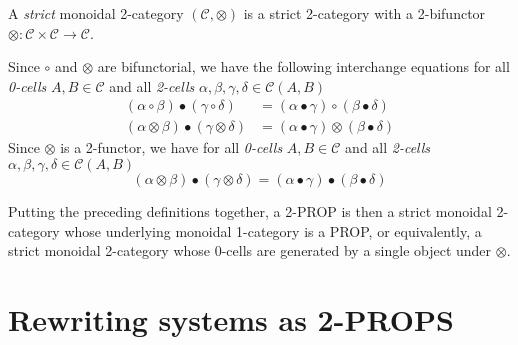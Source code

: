 \documentclass[a4paper]{article}
\begin{document}
\begin{definition}\label{def:monoidal-two-cat}
  A \emph{strict} monoidal 2-category $(\mathcal{C}, \otimes)$ is a
  strict 2-category with a 2-bifunctor $\otimes: \mathcal{C} \times
  \mathcal{C} \to \mathcal{C}$.
\end{definition}


\begin{remark}
  Since $\circ$ and $\otimes$ are bifunctorial, we have the following
    interchange equations for all \emph{0-cells} $A, B \in \mathcal{C}$ and all
    \emph{2-cells} $\alpha, \beta, \gamma, \delta \in \mathcal{C}(A, B)$
  \begin{align}
    (\alpha \circ \beta) \bullet (\gamma \circ \delta) &= (\alpha \bullet
      \gamma) \circ (\beta \bullet \delta) \\
    (\alpha \otimes \beta) \bullet (\gamma \otimes \delta) &= (\alpha \bullet
      \gamma) \otimes (\beta \bullet \delta)
  \end{align}
  Since $\otimes$ is a 2-functor, we have for all \emph{0-cells} $A, B \in
    \mathcal{C}$ and all \emph{2-cells} $\alpha, \beta, \gamma, \delta \in
    \mathcal{C}(A, B)$
  \[
    (\alpha \otimes \beta) \bullet (\gamma \otimes \delta) = (\alpha \bullet
      \gamma) \bullet (\beta \bullet \delta)
  \]
\end{remark}

Putting the preceding definitions together, a 2-PROP is then a strict
monoidal 2-category whose underlying monoidal 1-category is a PROP, or
equivalently, a strict monoidal 2-category whose 0-cells are generated
by a single object under $\otimes$.


\section{Rewriting systems as 2-PROPS}
\label{sec:rewriting}
\end{document}
